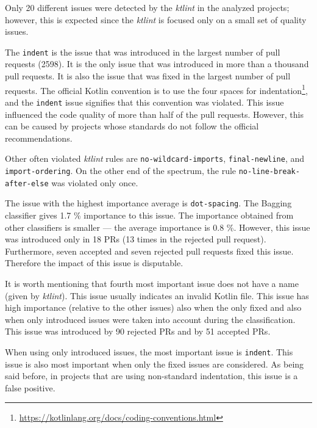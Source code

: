 \documentclass[digital,oneside,oldtable,nolof,nolot,nocover]{fithesis4}
\begin{document}
Only 20 different issues were detected by the \emph{ktlint} in the analyzed projects;
however, this is expected since the \emph{ktlint} is focused only on a small set of quality issues.

The \texttt{indent} is the issue that was introduced in the largest number of pull requests (2598). It is the
only issue that was introduced in more than a thousand pull requests. It is also the issue
that was fixed in the largest number of pull requests. The official Kotlin convention is
to use the four spaces for indentation\footnote{\url{https://kotlinlang.org/docs/coding-conventions.html}},
and the \texttt{indent} issue signifies that this convention was violated. This issue influenced
the code quality of more than half of the pull requests. However, this can be caused by projects
whose standards do not follow the official recommendations.

Other often violated \emph{ktlint} rules are \texttt{no-wildcard-imports}, \texttt{final-newline}, and \texttt{import-ordering}.
On the other end of the spectrum, the rule \texttt{no-line-break-after-else} was violated only once.


The issue with the highest importance average is \texttt{dot-spacing}.
The Bagging classifier gives 1.7 \% importance to this issue. The importance obtained from other
classifiers is smaller --- the average importance is 0.8 \%.
However, this issue was introduced only in 18 PRs (13 times in the rejected pull request).
Furthermore, seven accepted and seven rejected pull requests fixed this issue.
Therefore the impact of this issue is disputable.

It is worth mentioning that fourth most important issue does not have a name
(given by \emph{ktlint}).  This issue usually indicates an invalid Kotlin file.  This
issue has high importance (relative to the other issues) also when the only
fixed and also when only introduced issues were taken into account during the
classification. This issue was introduced by 90 rejected PRs and by 51
accepted PRs.

When using only introduced issues, the most important issue is \texttt{indent}.
This issue is also most important when only the fixed issues are considered.
As being said before, in projects that are using non-standard indentation,
this issue is a false positive.
\end{document}
